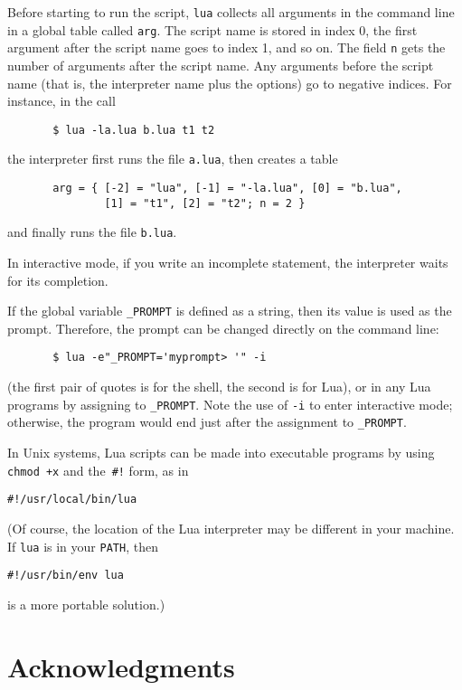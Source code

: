 \documentclass[11pt,twoside]{article}
\makeatletter
\newcommand{\T}[1]{{\tt #1}}
\newcommand{\IndexVerb}[1]{\T{#1}\index{#1@{\tt #1}}}
\makeatother
\begin{document}
Before starting to run the script,
\verb|lua| collects all arguments in the command line
in a global table called \verb|arg|.
The script name is stored in index 0,
the first argument after the script name goes to index 1,
and so on.
The field \verb|n| gets the number of arguments after the script name.
Any arguments before the script name
(that is, the interpreter name plus the options)
go to negative indices.
For instance, in the call
\begin{verbatim}
       $ lua -la.lua b.lua t1 t2
\end{verbatim}
the interpreter first runs the file \T{a.lua},
then creates a table
\begin{verbatim}
       arg = { [-2] = "lua", [-1] = "-la.lua", [0] = "b.lua",
               [1] = "t1", [2] = "t2"; n = 2 }
\end{verbatim}
and finally runs the file \T{b.lua}.

In interactive mode,
if you write an incomplete statement,
the interpreter waits for its completion.

If the global variable \IndexVerb{_PROMPT} is defined as a string,
then its value is used as the prompt.
Therefore, the prompt can be changed directly on the command line:
\begin{verbatim}
       $ lua -e"_PROMPT='myprompt> '" -i
\end{verbatim}
(the first pair of quotes is for the shell,
the second is for Lua),
or in any Lua programs by assigning to \verb|_PROMPT|.
Note the use of \verb|-i| to enter interactive mode; otherwise,
the program would end just after the assignment to \verb|_PROMPT|.

In Unix systems, Lua scripts can be made into executable programs
by using \verb|chmod +x| and the~\verb|#!| form,
as in
\begin{verbatim}
#!/usr/local/bin/lua
\end{verbatim}
(Of course,
the location of the Lua interpreter may be different in your machine.
If \verb|lua| is in your \verb|PATH|,
then 
\begin{verbatim}
#!/usr/bin/env lua
\end{verbatim}
is a more portable solution.) 

\section*{Acknowledgments}
\end{document}
